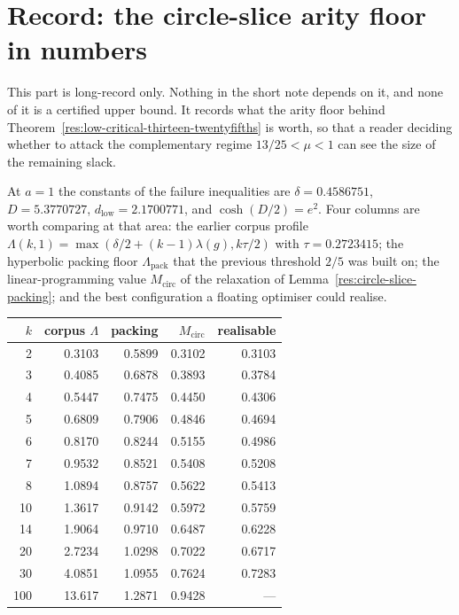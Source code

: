 \section{Record: the circle-slice arity floor in numbers}
\label{sec:record-circle-slice}

This part is long-record only.  Nothing in the short note depends on it, and
none of it is a certified upper bound.  It records what the arity floor behind
Theorem~\ref{res:low-critical-thirteen-twentyfifths} is worth, so that a reader
deciding whether to attack the complementary regime $13/25<\mu<1$ can see the
size of the remaining slack.

At $a=1$ the constants of the failure inequalities are
$\delta=0.4586751$, $D=5.3770727$, $d_{\mathrm{low}}=2.1700771$, and
$\cosh(D/2)=e^{2}$.  Four columns are worth comparing at that area: the
earlier corpus profile $\Lambda(k,1)=\max(\delta/2+(k-1)\lambda(g),k\tau/2)$
with $\tau=0.2723415$; the hyperbolic packing floor $\Lambda_{\mathrm{pack}}$
that the previous threshold $2/5$ was built on; the linear-programming value
$M_{\mathrm{circ}}$ of the relaxation of
Lemma~\ref{res:circle-slice-packing}; and the best configuration a floating
optimiser could realise.

\begin{center}
\begin{tabular}{@{}rrrrr@{}}
\toprule
$k$ & corpus $\Lambda$ & packing & $M_{\mathrm{circ}}$ & realisable \\
\midrule
2 & 0.3103 & 0.5899 & 0.3102 & 0.3103 \\
3 & 0.4085 & 0.6878 & 0.3893 & 0.3784 \\
4 & 0.5447 & 0.7475 & 0.4450 & 0.4306 \\
5 & 0.6809 & 0.7906 & 0.4846 & 0.4694 \\
6 & 0.8170 & 0.8244 & 0.5155 & 0.4986 \\
7 & 0.9532 & 0.8521 & 0.5408 & 0.5208 \\
8 & 1.0894 & 0.8757 & 0.5622 & 0.5413 \\
10 & 1.3617 & 0.9142 & 0.5972 & 0.5759 \\
14 & 1.9064 & 0.9710 & 0.6487 & 0.6228 \\
20 & 2.7234 & 1.0298 & 0.7022 & 0.6717 \\
30 & 4.0851 & 1.0955 & 0.7624 & 0.7283 \\
100 & 13.617 & 1.2871 & 0.9428 & --- \\
\bottomrule
\end{tabular}
\end{center}

